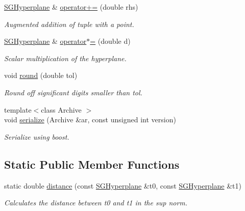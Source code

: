 \begin{DoxyCompactItemize}
\hyperlink{classSGHyperplane}{S\+G\+Hyperplane} \& \hyperlink{classSGHyperplane_a8ae5f73b29eb37d186e28e2397d27eca}{operator+=} (double rhs)
\begin{DoxyCompactList}\small\item\em Augmented addition of tuple with a point. \end{DoxyCompactList}\item 
\mbox{\label{classSGHyperplane_a8f06272872b7401c2b3fb813edf6598c}} 
\hyperlink{classSGHyperplane}{S\+G\+Hyperplane} \& \hyperlink{classSGHyperplane_a8f06272872b7401c2b3fb813edf6598c}{operator$\ast$=} (double d)
\begin{DoxyCompactList}\small\item\em Scalar multiplication of the hyperplane. \end{DoxyCompactList}\item 
\mbox{\label{classSGHyperplane_a02ec6baabcf5857e6fd2499b587fe9fc}} 
void \hyperlink{classSGHyperplane_a02ec6baabcf5857e6fd2499b587fe9fc}{round} (double tol)
\begin{DoxyCompactList}\small\item\em Round off significant digits smaller than tol. \end{DoxyCompactList}\item 
\mbox{\label{classSGHyperplane_a667377972806a13c704dcd728340878d}} 
{\footnotesize template$<$class Archive $>$ }\\void \hyperlink{classSGHyperplane_a667377972806a13c704dcd728340878d}{serialize} (Archive \&ar, const unsigned int version)
\begin{DoxyCompactList}\small\item\em Serialize using boost. \end{DoxyCompactList}\end{DoxyCompactItemize}
\subsection*{Static Public Member Functions}
\begin{DoxyCompactItemize}
\item 
\mbox{\label{classSGHyperplane_abe0d95282d0fe15ea7ac5e1d138ea527}} 
static double \hyperlink{classSGHyperplane_abe0d95282d0fe15ea7ac5e1d138ea527}{distance} (const \hyperlink{classSGHyperplane}{S\+G\+Hyperplane} \&t0, const \hyperlink{classSGHyperplane}{S\+G\+Hyperplane} \&t1)
\begin{DoxyCompactList}\small\item\em Calculates the distance between t0 and t1 in the sup norm. \end{DoxyCompactList}\end{DoxyCompactItemize}
